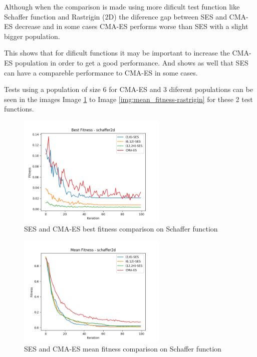 Although when the comparison is made using more dificult test function like Schaffer function and Rastrigin (2D) the diference gap between SES and CMA-ES decrease and in some cases CMA-ES performs worse than SES with a slight bigger population.

This shows that for dificult functions it may be important to increase the CMA-ES population in order to get a good performance. And shows as well that SES can have a compareble performance to CMA-ES in some cases.

Tests using a population of size 6 for CMA-ES and 3 diferent populations can be seen in the images Image \ref{img:best_fitness-schaffer2d} to Image \ref{img:mean_fitness-rastrigin} for these 2 test functions.

\begin{figure}
  \begin{center}
  \includegraphics[width=2.8in]{./../code/benchmark_results/best_fitness-schaffer2d.png}
  \caption{SES and CMA-ES best fitness comparison on Schaffer function}
  \label{img:best_fitness-schaffer2d}
  \end{center}
\end{figure}

\begin{figure}
  \begin{center}
  \includegraphics[width=2.8in]{./../code/benchmark_results/mean_fitness-schaffer2d.png}
  \caption{SES and CMA-ES mean fitness comparison on Schaffer function}
  \label{img:mean_fitness-schaffer2d}
  \end{center}
\end{figure}

